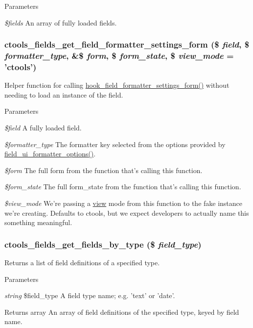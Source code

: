 \begin{DoxyParams}{Parameters}
\item[{\em \$fields}]An array of fully loaded fields. \end{DoxyParams}
\hypertarget{fields_8inc_a73335c2fc8c4ac79f671d1b7a8033a10}{
\subsubsection[{ctools\_\-fields\_\-get\_\-field\_\-formatter\_\-settings\_\-form}]{\setlength{\rightskip}{0pt plus 5cm}ctools\_\-fields\_\-get\_\-field\_\-formatter\_\-settings\_\-form (\$ {\em field}, \/  \$ {\em formatter\_\-type}, \/  \&\$ {\em form}, \/  \$ {\em form\_\-state}, \/  \$ {\em view\_\-mode} = {\ttfamily 'ctools'})}}
\label{fields_8inc_a73335c2fc8c4ac79f671d1b7a8033a10}
Helper function for calling \hyperlink{group__field__types_gaf9b6aefe0b4fe6c03ebd5bd9bd1b891b}{hook\_\-field\_\-formatter\_\-settings\_\-form()} without needing to load an instance of the field.


\begin{DoxyParams}{Parameters}
\item[{\em \$field}]A fully loaded field. \item[{\em \$formatter\_\-type}]The formatter key selected from the options provided by \hyperlink{field__ui_8admin_8inc_a88c9dd1dd2d56b80a7ab2b0ef9b2632b}{field\_\-ui\_\-formatter\_\-options()}. \item[{\em \$form}]The full form from the function that's calling this function. \item[{\em \$form\_\-state}]The full form\_\-state from the function that's calling this function. \item[{\em \$view\_\-mode}]We're passing a \hyperlink{classview}{view} mode from this function to the fake instance we're creating. Defaults to ctools, but we expect developers to actually name this something meaningful. \end{DoxyParams}
\hypertarget{fields_8inc_a008f62d9ea68df7c92397fee45e5bf50}{
\subsubsection[{ctools\_\-fields\_\-get\_\-fields\_\-by\_\-type}]{\setlength{\rightskip}{0pt plus 5cm}ctools\_\-fields\_\-get\_\-fields\_\-by\_\-type (\$ {\em field\_\-type})}}
\label{fields_8inc_a008f62d9ea68df7c92397fee45e5bf50}
Returns a list of field definitions of a specified type.


\begin{DoxyParams}{Parameters}
\item[{\em string}]\$field\_\-type A field type name; e.g. 'text' or 'date'.\end{DoxyParams}
\begin{DoxyReturn}{Returns}
array An array of field definitions of the specified type, keyed by field name. 
\end{DoxyReturn}
